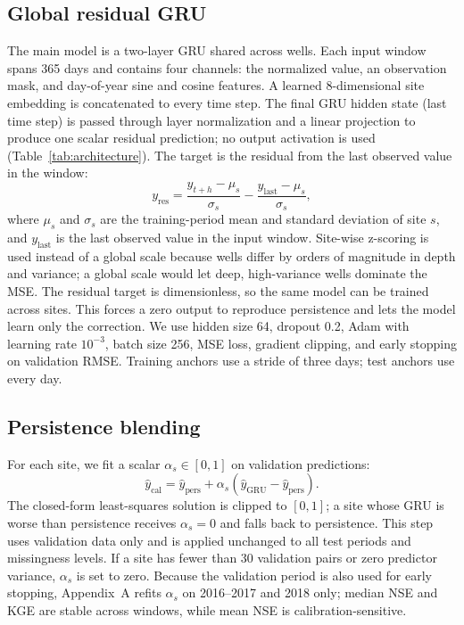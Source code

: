 \documentclass[preprint,12pt]{elsarticle}
\begin{document}
\subsection{Global residual GRU}

The main model is a two-layer GRU \citep{cho2014} shared across wells. Each
input window spans 365 days and contains four channels: the normalized value,
an observation mask, and day-of-year sine and cosine features. A learned
8-dimensional site embedding is concatenated to every time step. The final GRU
hidden state (last time step) is passed through layer normalization and a
linear projection to produce one scalar residual prediction; no output
activation is used (Table~\ref{tab:architecture}). The target is the residual from
the last observed value in the window:
\begin{equation}
  y_{\text{res}} = \frac{y_{t+h} - \mu_s}{\sigma_s}
  - \frac{y_{\text{last}} - \mu_s}{\sigma_s},
\end{equation}
where $\mu_s$ and $\sigma_s$ are the training-period mean and standard deviation
of site $s$, and $y_{\text{last}}$ is the last observed value in the input
window. Site-wise z-scoring is used instead of a global scale because wells
differ by orders of magnitude in depth and variance; a global scale would let
deep, high-variance wells dominate the MSE. The residual target is
dimensionless, so the same model can be trained across sites. This forces a
zero output to reproduce persistence and lets the model learn only the
correction. We use hidden size 64, dropout 0.2, Adam with
learning rate $10^{-3}$, batch size 256, MSE loss, gradient clipping, and early
stopping on validation RMSE. Training anchors use a stride of three days; test
anchors use every day.

\subsection{Persistence blending}

For each site, we fit a scalar $\alpha_s \in [0,1]$ on validation predictions:
\begin{equation}
  \hat{y}_{\text{cal}} = \hat{y}_{\text{pers}} +
  \alpha_s \left(\hat{y}_{\text{GRU}} - \hat{y}_{\text{pers}}\right).
\end{equation}
The closed-form least-squares solution is clipped to $[0,1]$; a site whose GRU
is worse than persistence receives $\alpha_s=0$ and falls back to persistence.
This step uses validation data only and is applied unchanged to all test
periods and missingness levels. If a site has fewer than 30 validation pairs or
zero predictor variance, $\alpha_s$ is set to zero. Because the validation
period is also used for early stopping, Appendix~A refits
$\alpha_s$ on 2016--2017 and 2018 only; median NSE and KGE are stable across
windows, while mean NSE is calibration-sensitive.
\end{document}

